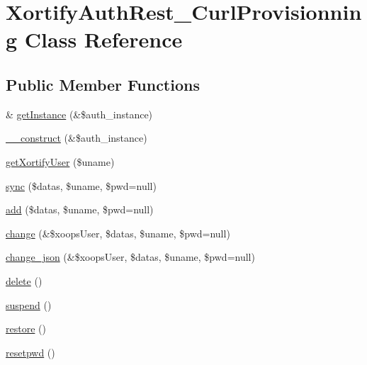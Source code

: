 \hypertarget{class_xortify_auth_rest___curl_provisionning}{\section{Xortify\-Auth\-Rest\-\_\-\-Curl\-Provisionning Class Reference}
\label{class_xortify_auth_rest___curl_provisionning}
}
\subsection*{Public Member Functions}
\begin{DoxyCompactItemize}
\item 
\& \hyperlink{class_xortify_auth_rest___curl_provisionning_a2c8eaa915c70d75289ac8a03686194f9}{get\-Instance} (\&\$auth\-\_\-instance)
\item 
\hyperlink{class_xortify_auth_rest___curl_provisionning_a0f25832dc86774e7605b81fe57b083c2}{\-\_\-\-\_\-construct} (\&\$auth\-\_\-instance)
\item 
\hyperlink{class_xortify_auth_rest___curl_provisionning_a041d726ac26672547ed1504e8e0117aa}{get\-Xortify\-User} (\$uname)
\item 
\hyperlink{class_xortify_auth_rest___curl_provisionning_a35dc08b0f2138eb818ff95345b73bcff}{sync} (\$datas, \$uname, \$pwd=null)
\item 
\hyperlink{class_xortify_auth_rest___curl_provisionning_adfc9fcef01e7bd7b2f47e8e79d51fc63}{add} (\$datas, \$uname, \$pwd=null)
\item 
\hyperlink{class_xortify_auth_rest___curl_provisionning_ae1f0971b9712c794620cf309164e43af}{change} (\&\$xoops\-User, \$datas, \$uname, \$pwd=null)
\item 
\hyperlink{class_xortify_auth_rest___curl_provisionning_a94f4e0408f26e65abca347ec883f4ec9}{change\-\_\-json} (\&\$xoops\-User, \$datas, \$uname, \$pwd=null)
\item 
\hyperlink{class_xortify_auth_rest___curl_provisionning_a13bdffdd926f26b825ea57066334ff01}{delete} ()
\item 
\hyperlink{class_xortify_auth_rest___curl_provisionning_ad73006a505121228f3b075c2409787d2}{suspend} ()
\item 
\hyperlink{class_xortify_auth_rest___curl_provisionning_aa1371f22826cf8cde4454c9b467203d0}{restore} ()
\item 
\hyperlink{class_xortify_auth_rest___curl_provisionning_a06d70fbd3a2db390b6f2530c0076628e}{resetpwd} ()
\end{DoxyCompactItemize}
